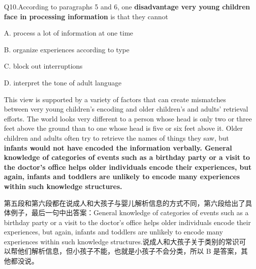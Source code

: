 \begin{blk}
    \begin{qst}
        Q10.According to paragraphs 5 and 6, one \textbf{disadvantage very young children face in processing information} is that they cannot
    \end{qst}

    \begin{chc}
        A. process a lot of information at one time

        B. organize experiences according to type

        C. block out interruptions

        D. interpret the tone of adult language
    \end{chc}

    \begin{psgq}
        This view is supported by a variety of factors that can create mismatches between very young children's encoding and older children's and adults' retrieval efforts. The world looks very different to a person whose head is only two or three feet above the ground than to one whose head is five or six feet above it. Older children and adults often try to retrieve the names of things they saw, but \textbf{infants would not have encoded the information verbally. General knowledge of categories of events such as a birthday party or a visit to the doctor's office helps older individuals encode their experiences, but again, infants and toddlers are unlikely to encode many experiences within such knowledge structures.}
    \end{psgq}

    \begin{nlz}
        第五段和第六段都在说成人和大孩子与婴儿解析信息的方式不同，第六段给出了具体例子，最后一句中出答案：General knowledge of categories of events such as a birthday party or a visit to the doctor's office helps older individuals encode their experiences, but again, infants and toddlers are unlikely to encode many experiences within such knowledge structures.说成人和大孩子关于类别的常识可以帮他们解析信息，但小孩子不能，也就是小孩子不会分类，所以 B 是答案，其他都没说。
    \end{nlz}
\end{blk}

